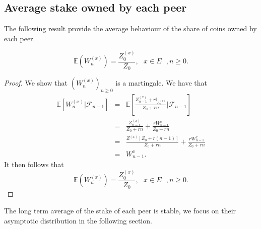 \subsection{Average stake owned by each peer}
The following result provide the average behaviour of the share of coins owned by each peer.
\begin{prop}\label{prop:average_stakes}
$$
\mathbb{E}(W_n^{(x)}) = \frac{Z_0^{(x)}}{Z_0},\text{ }x\in E\text{ }, n\geq0.
$$
\end{prop}
\begin{proof}
We show that $(W_n^{(x)})_{n\geq0}$ is a martingale. We have that 
\begin{eqnarray*}
\mathbb{E}\left[W_n^{(x)}|\mathcal{F}_{n-1}\right]&=& \mathbb{E}\left[\frac{Z^{(x)}_{n-1} + r\mathbb{I}_{A_n^{(x)}}}{Z_0 + rn}\Big \rvert\mathcal{F}_{n-1}\right]\\
&=& \frac{Z^{(x)}_{n-1} }{Z_0 + rn}+\frac{rW_{n-1}^{x}}{Z_0 + rn}\\\
&=& \frac{Z^{(x)}[Z_0 + r(n-1)]}{Z_0 + rn}+\frac{rW_{n-1}^{x}}{Z_0 + rn}\\
&=&W_{n-1}^{x}.
\end{eqnarray*}
It then follows that 
$$
\mathbb{E}\left(W_n^{(x)}\right) = \frac{Z_0^{(x)}}{Z_0},\text{ }x\in E\text{ }, n\geq0.
$$
\end{proof}
The long term average of the stake of each peer is stable, we focus on their asymptotic distribution in the following section.
